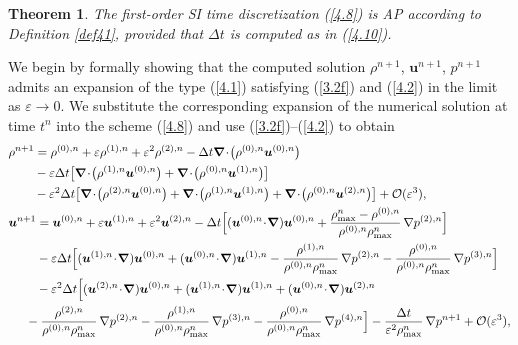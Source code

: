 \documentclass[A4paper,12pt,twoside]{article}
\newtheorem{theorem}{Theorem}[section]
\newenvironment{proof}{{\flushleft \bf Proof:}}{}
\numberwithin{equation}{section}
\numberwithin{figure}{section}
\numberwithin{table}{section}
\def\bnabla{\bm{\nabla}}
\newcommand{\dt}{\Delta t}
\newcommand{\ve}{\varepsilon}
\newcommand\eref[1]{(\ref{#1})}
\begin{document}
\begin{theorem}\label{thm31}
The first-order SI time discretization \eref{4.8} is AP according to Definition \ref{def41}, provided that $\dt$ is computed as in
\eref{4.10}.
\end{theorem}
\begin{proof}
We begin by formally showing that the computed solution $\rho^{n+1}$, $\bm u^{n+1}$, $p^{n+1}$ admits an expansion of the type \eref{4.1}
satisfying \eref{3.2f} and \eref{4.2} in the limit as $\ve\to0$. We substitute the corresponding expansion of the numerical solution at 
time $t^n$ into the scheme \eref{4.8} and use \eref{3.2f}--\eref{4.2} to obtain
\begin{align}
&\begin{aligned}
\rho^{n+1}&=\rho^{(0),n}+\ve\rho^{(1),n}+\ve^2\rho^{(2),n}-\dt\bnabla\!\cdot\!\big(\rho^{(0),n}\bm u^{(0),n}\big)\\
&-\ve \dt \big[\bnabla\!\cdot\!\big(\rho^{(1),n}\bm u^{(0),n}\big)+\bnabla\!\cdot\!\big(\rho^{(0),n}\bm u^{(1),n}\big)\big]\\
&-\ve^2 \dt \big[\bnabla\!\cdot\!\big(\rho^{(2),n}\bm u^{(0),n}\big)+\bnabla\!\cdot\!\big(\rho^{(1),n}\bm u^{(1),n}\big)+\bnabla\!\cdot\!\big(\rho^{(0),n}\bm u^{(2),n}\big)\big]+{\cal O}(\ve^3),
\label{4.11}
\end{aligned}\\
&\begin{aligned}
\bm u^{n+1}&=\bm u^{(0),n}+\ve\bm u^{(1),n}+\ve^2\bm u^{(2),n}-\dt\Big[(\bm u^{(0),n}\!\cdot\!\bnabla)\bm u^{(0),n}+
\frac{\rho_{\max}^n-\rho^{(0),n}}{\rho^{(0),n}\rho_{\max}^n}\,\nabla p^{(2),n}\Big]\\
&-\ve\dt\Big[(\bm u^{(1),n}\!\cdot\!\bnabla)\bm u^{(0),n}+(\bm u^{(0),n}\!\cdot\!\bnabla)\bm u^{(1),n}-
\frac{\rho^{(1),n}}{\rho^{(0),n}\rho_{\max}^n}\,\nabla p^{(2),n}-\frac{\rho^{(0),n}}{\rho^{(0),n}\rho_{\max}^n}\,\nabla p^{(3),n}\Big]\\
&-\ve^2\dt\Big[(\bm u^{(2),n}\!\cdot\!\bnabla)\bm u^{(0),n}+(\bm u^{(1),n}\!\cdot\!\bnabla)\bm u^{(1),n}+
(\bm u^{(0),n}\!\cdot\!\bnabla)\bm u^{(2),n}\\
&\hspace*{-0.3cm}
-\frac{\rho^{(2),n}}{\rho^{(0),n}\rho_{\max}^n}\,\nabla p^{(2),n}-\frac{\rho^{(1),n}}{\rho^{(0),n}\rho_{\max}^n}\,\nabla p^{(3),n}
-\frac{\rho^{(0),n}}{\rho^{(0),n}\rho_{\max}^n}\,\nabla p^{(4),n}\Big]
-\frac{\dt}{\ve^2 \rho_{\max}^n}\,\nabla p^{n+1}+{\cal O}(\ve^3),\label{4.12}
\end{aligned}\\[0.8ex]

\end{align}
\end{proof}
\end{document}
